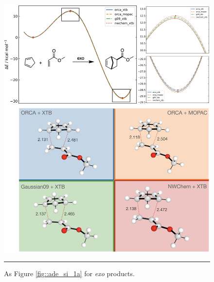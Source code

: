 \documentclass[../../main.tex]{subfiles}
\begin{document}
\begin{figure}[h!]
	\vspace{0.4cm}
	\centering
	\includegraphics[width=14cm]{5/autode/figs/figS1b}
	\vspace{0.4cm}
	\hrule
	\caption{As Figure \ref{fig::ade_si_1a} for \emph{exo} products.}
	\label{fig::ade_si_1b}
\end{figure}
\end{document}
